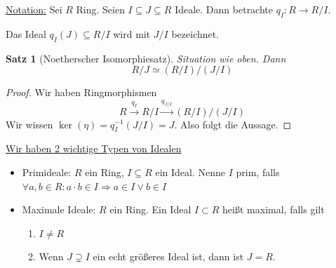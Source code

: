 \documentclass[a4paper,12pt,numbers=noenddot,parskip=full]{scrartcl}
\newcommand{\heading}{\underline}
\theoremstyle{dotless}
\newtheorem{theorem}{Satz}[section]
\theoremstyle{remark}
\begin{document}
	\heading{Notation:} Sei $R$ Ring. Seien $I \subseteq J \subseteq R$ Ideale. Dann betrachte $q_I: R \to R/I$.
	
	Das Ideal $q_I(J) \subseteq R/I$ wird mit $J/I$ bezeichnet.

	\begin{theorem}[Noetherscher Isomorphiesatz]
		Situation wie oben. Dann
		\begin{equation*}
			R/J \simeq (R/I) / (J/I)
		\end{equation*}
	\end{theorem}

	\begin{proof}
		Wir haben Ringmorphismen
		\begin{equation*}
			R \overset{q_I}{\longrightarrow} R/I \overset{q_{J/I}}{\longrightarrow} (R/I) / (J/I)
		\end{equation*}
		Wir wissen $\ker(\eta) = q_I^{-1}(J/I) = J$. Also folgt die Aussage.
	\end{proof}

	\heading{Wir haben 2 wichtige Typen von Idealen}
	\begin{itemize}
		\item Primideale: $R$ ein Ring, $I \subseteq R$ ein Ideal. Nenne $I$ prim, falls $\forall a,b \in R: a \cdot b \in I \Rightarrow a \in I \lor b \in I$
		\item Maximale Ideale: $R$ ein Ring. Ein Ideal $I \subset R$ heißt maximal, falls gilt
		\begin{enumerate}
			\item $I \neq R$
			\item Wenn $J \supsetneq I$ ein echt größeres Ideal ist, dann ist $J = R$.
		\end{enumerate}
	\end{itemize}
\end{document}
